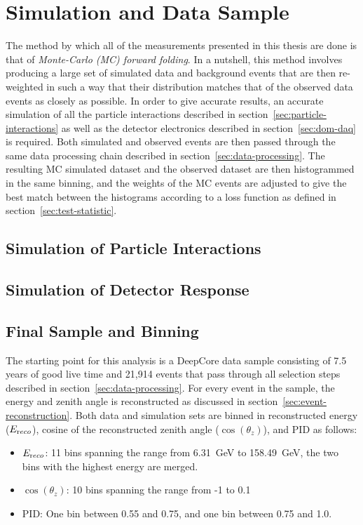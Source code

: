 \section{Simulation and Data Sample}

The method by which all of the measurements presented in this thesis are done is that of \emph{Monte-Carlo (MC) forward folding}. In a nutshell, this method involves producing a large set of simulated data and background events that are then re-weighted in such a way that their distribution matches that of the observed data events as closely as possible. In order to give accurate results, an accurate simulation of all the particle interactions described in section~\ref{sec:particle-interactions} as well as the detector electronics described in section~\ref{sec:dom-daq} is required. Both simulated and observed events are then passed through the same data processing chain described in section~\ref{sec:data-processing}. The resulting MC simulated dataset and the observed dataset are then histogrammed in the same binning, and the weights of the MC events are adjusted to give the best match between the histograms according to a loss function as defined in section~\ref{sec:test-statistic}.

\subsection{Simulation of Particle Interactions}

\subsection{Simulation of Detector Response}

\subsection{Final Sample and Binning}
\label{sec:sample-binning}
The starting point for this analysis is a DeepCore data sample consisting of 7.5 years of good live time and 21,914 events that pass through all selection steps described in section~\ref{sec:data-processing}. For every event in the sample, the energy and zenith angle is reconstructed as discussed in section~\ref{sec:event-reconstruction}. Both data and simulation sets are binned in reconstructed energy ($E_{\rm reco}$), cosine of the reconstructed zenith angle ($\cos(\theta_z)$), and PID as follows:

\begin{itemize}
    \item $E_{\rm reco}$: 11 bins spanning the range from 6.31~GeV to 158.49~GeV, the two bins with the highest energy are merged.
    \item $\cos(\theta_z)$: 10 bins spanning the range from -1 to 0.1
    \item PID: One bin between 0.55 and 0.75, and one bin between 0.75 and 1.0.
\end{itemize}

